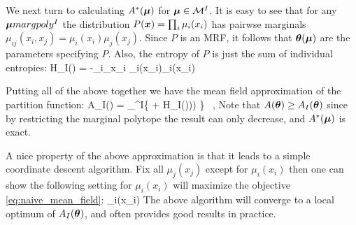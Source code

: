 We next turn to calculating $A^*(\boldsymbol{\mu})$ for $\boldsymbol{\mu}\in{\cal{M}}^{I}$. It is easy to see that for any $\boldsymbol{\mu}\\margpoly^{I}$  the distribution $P(\boldsymbol{x}) = \prod_{i} \mu_i(x_i)$ has pairwse marginals $\mu_{ij}(x_i,x_j) =  \mu_i(x_i)\mu_j(x_j)$. Since $P$ is an MRF, it follows that
$\boldsymbol{\theta}(\boldsymbol{\mu})$ are the parameters specifying $P$. Also, the entropy of $P$ is just the sum of individual entropies:
\be
H_{I}(\muv) = -\sum_{i}\sum_{x_i} \mu_i(x_i)\log\mu_i(x_i)
\ee 

Putting all of the above together we have the mean field approximation of the partition function:  
\be
A_{I}(\thetav) = \sup_{\muv \in \margpoly^{I}}\left \{ \muv \cdot \thetav + H_{I}(\muv))) \right\} \label{eq:naive_mean_field}~,
\ee
Note that $A(\boldsymbol{\theta}) \geq A_{I}(\boldsymbol{\theta})$ since by restricting the marginal polytope the result can only decrease, and $A^*(\boldsymbol{\mu})$ is exact.

A nice property of the above approximation is that it leads to a simple coordinate descent algorithm. Fix all $\mu_j(x_j)$ except for $\mu_i(x_i)$ then one can show the following setting for $\mu_i(x_i)$ will maximize the objective \eqref{eq:naive_mean_field}:
\be
\mu_i(x_i) \propto {} \label{eq:naive_iter}
\ee
The above algorithm will converge to a local optimum of $A_{I}(\boldsymbol{\theta})$, and often provides good results in practice.


